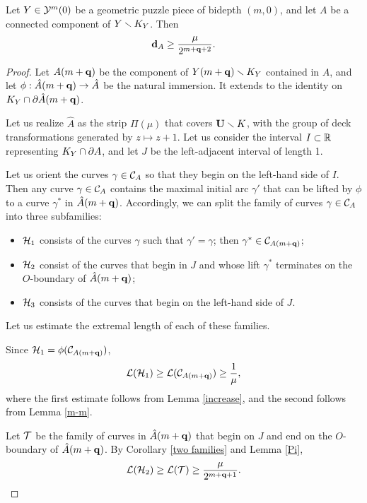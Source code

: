 \begin{lem}\label{m-0}
  Let $Y\in {\mathcal Y}^m(0)$ be a geometric puzzle piece of bidepth $(m,0)$,
and let  $A$ be a connected component of $Y\smallsetminus K_Y$.
Then
$$
   {\mathbf{d}}_A \geq \frac{\mu}{2^{m+{\mathbf{q}}+2}}.
$$
\end{lem}

\begin{proof}
Let $A(m+{\mathbf{q}})$ be the component of $Y(m+{\mathbf{q}})\smallsetminus K_Y$ contained in $A$,
and let $\phi: \hat A(m+{\mathbf{q}})\rightarrow \hat A$ be the natural immersion.
It extends to the identity on $K_Y\cap \partial \hat A(m+{\mathbf{q}})$.

 Let us realize   $\hat A$ as the strip $\Pi(\mu)$ that covers ${\mathbf{U}} \smallsetminus K$,
with the group of deck transformations generated by $z\mapsto z+1$.
Let us consider the interval $I \subset {\Bbb R}$  representing $K_Y\cap \partial A$,
and let $J$ be the left-adjacent interval of length 1.

Let us orient the curves $\gamma\in {\mathcal C}_A$ so that they begin on the left-hand side of $I$.
Then any curve $\gamma\in {\mathcal C}_A$ contains the maximal initial arc $\gamma'$ that can be lifted
by $\phi$ to a curve $\gamma^*$ in  $\hat A(m+{\mathbf{q}})$.
Accordingly,  we can split the family of curves $\gamma\in {\mathcal C}_A$ into three subfamilies:
\begin{itemize}
  \item ${\mathcal H}_1$ consists of the curves $\gamma$ such that $\gamma'=\gamma$;
   then  $\gamma^*\in {\mathcal C}_{A(m+{\mathbf{q}})}$;

  \item ${\mathcal H}_2$ consist of the curves that begin in $J$ and whose
lift $\gamma^*$ terminates on the $O$-boundary of $\hat A(m+{\mathbf{q}})$;

   \item ${\mathcal H}_3$ consists of the curves that begin on  the left-hand side of $J$.
\end{itemize}

Let us estimate the extremal length of each of these families.

Since ${\mathcal H}_1 = \phi ({\mathcal C}_{A(m+{\mathbf{q}})})$,
$$
  {\mathcal L}({\mathcal H}_1)\geq {\mathcal L}({\mathcal C}_{A(m+{\mathbf{q}})})\geq \frac{1}{\mu},
$$
where the first estimate follows from Lemma \ref{increase}, and the second follows from
Lemma \ref{m-m}.

Let ${\mathcal T}$ be the family of curves in $\hat A(m+{\mathbf{q}})$ that begin on $J$ and end on the
$O$-boundary of $\hat A(m+{\mathbf{q}})$. By Corollary \ref{two families} and Lemma \ref{Pi},
$$
   {\mathcal L}({\mathcal H}_2)\geq {\mathcal L}({\mathcal T})\geq \frac{\mu}{2^{m+{\mathbf{q}}+1}}.
$$


\end{proof}
